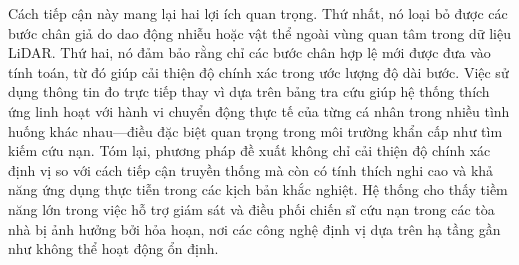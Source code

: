 Cách tiếp cận này mang lại hai lợi ích quan trọng. Thứ nhất, nó loại bỏ được các bước chân giả do dao động nhiễu hoặc vật thể ngoài vùng quan tâm trong dữ liệu LiDAR. Thứ hai, nó đảm bảo rằng chỉ các bước chân hợp lệ mới được đưa vào tính toán, từ đó giúp cải thiện độ chính xác trong ước lượng độ dài bước. Việc sử dụng thông tin đo trực tiếp thay vì dựa trên bảng tra cứu giúp hệ thống thích ứng linh hoạt với hành vi chuyển động thực tế của từng cá nhân trong nhiều tình huống khác nhau—điều đặc biệt quan trọng trong môi trường khẩn cấp như tìm kiếm cứu nạn. Tóm lại, phương pháp đề xuất không chỉ cải thiện độ chính xác định vị so với cách tiếp cận truyền thống mà còn có tính thích nghi cao và khả năng ứng dụng thực tiễn trong các kịch bản khắc nghiệt. Hệ thống cho thấy tiềm năng lớn trong việc hỗ trợ giám sát và điều phối chiến sĩ cứu nạn trong các tòa nhà bị ảnh hưởng bởi hỏa hoạn, nơi các công nghệ định vị dựa trên hạ tầng gần như không thể hoạt động ổn định.

